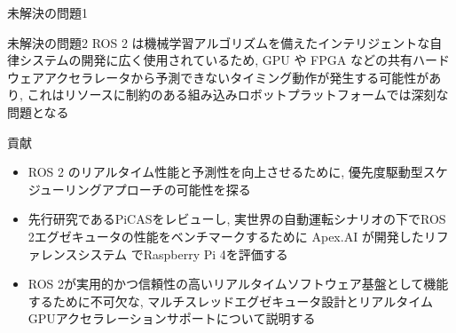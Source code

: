 
\begin{frame}{未解決の問題1}
\end{frame}

\begin{frame}{未解決の問題2}
    ROS 2 は機械学習アルゴリズムを備えたインテリジェントな自律システムの開発に広く使用されているため, GPU や FPGA などの共有ハードウェアアクセラレータから予測できないタイミング動作が発生する可能性があり, これはリソースに制約のある組み込みロボットプラットフォームでは深刻な問題となる
\end{frame}

\begin{frame}{貢献}
    \begin{itemize}
        \item ROS 2 のリアルタイム性能と予測性を向上させるために, 優先度駆動型スケジューリングアプローチの可能性を探る
        \item 先行研究であるPiCASをレビューし, 実世界の自動運転シナリオの下でROS 2エグゼキュータの性能をベンチマークするために Apex.AI が開発したリファレンスシステム でRaspberry Pi 4を評価する
        \item ROS 2が実用的かつ信頼性の高いリアルタイムソフトウェア基盤として機能するために不可欠な, マルチスレッドエグゼキュータ設計とリアルタイムGPUアクセラレーションサポートについて説明する
    \end{itemize}
\end{frame}
